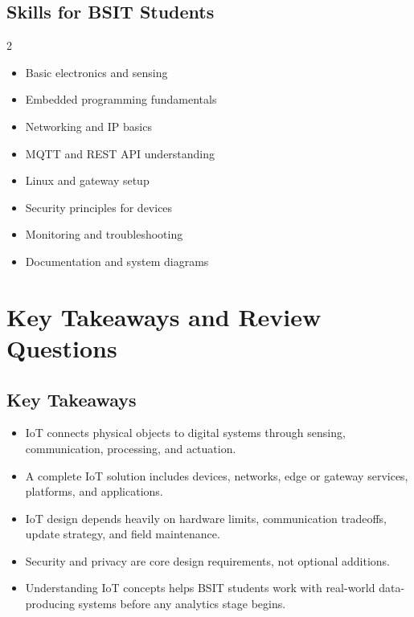 \documentclass[11pt,a4paper]{article}
\begin{document}
\subsection{Skills for BSIT Students}

\begin{multicols}{2}
\begin{itemize}[leftmargin=1.2em]
  \item Basic electronics and sensing
  \item Embedded programming fundamentals
  \item Networking and IP basics
  \item MQTT and REST API understanding
  \item Linux and gateway setup
  \item Security principles for devices
  \item Monitoring and troubleshooting
  \item Documentation and system diagrams
\end{itemize}
\end{multicols}

\section{Key Takeaways and Review Questions}

\subsection{Key Takeaways}

\begin{itemize}[leftmargin=*]
  \item IoT connects physical objects to digital systems through sensing, communication, processing, and actuation.
  \item A complete IoT solution includes devices, networks, edge or gateway services, platforms, and applications.
  \item IoT design depends heavily on hardware limits, communication tradeoffs, update strategy, and field maintenance.
  \item Security and privacy are core design requirements, not optional additions.
  \item Understanding IoT concepts helps BSIT students work with real-world data-producing systems before any analytics stage begins.
\end{itemize}
\end{document}
